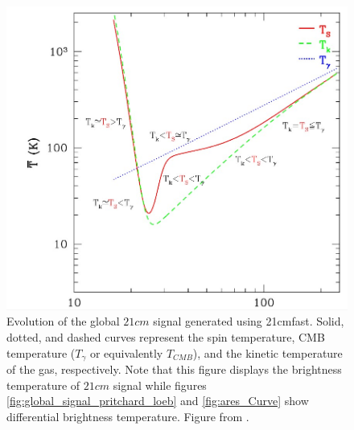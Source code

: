 \documentclass[12pt, TexShade, letterpaper]{report}
\begin{document}
\begin{figure}[h!]
    \centering
    \includegraphics[scale = 0.6]{21cm_curve.jpg}
    \caption[Evolution of the global $21cm$ signal generated using \gls{21cmfast}]{Evolution of the  global $21cm$ signal generated using \gls{21cmfast}. Solid, dotted, and dashed curves represent the spin temperature, CMB temperature ($T_\gamma$ or equivalently $T_{CMB}$), and the kinetic temperature of the gas, respectively. Note that this figure displays the brightness temperature of $21cm$ signal while figures \ref{fig:global_signal_pritchard_loeb} and \ref{fig:ares_Curve} show differential brightness temperature. Figure from \cite{21cmfast_python}.}
    \label{fig:21cmfast_curve}
\end{figure}
\end{document}

